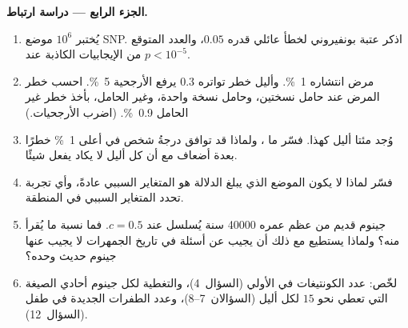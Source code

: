 \begin{problem}
\medskip
\noindent\textbf{الجزء الرابع --- دراسة ارتباط.}
\begin{enumerate}[resume]
  \item يُختبر $10^{6}$ موضع SNP. اذكر عتبة بونفيروني لخطأ
        عائلي قدره $0.05$، والعدد المتوقع من الإيجابيات
        الكاذبة عند $p < 10^{-5}$.
  \item مرض انتشاره \qty{1}{\%}. وأليل خطر تواتره
        $0.3$ يرفع الأرجحية \qty{5}{\%}. احسب خطر المرض
        عند حامل نسختين، وحامل نسخة واحدة، وغير الحامل، بأخذ
        خطر غير الحامل \qty{0.9}{\%}. (اضرب الأرجحيات.)
  \item وُجد مئتا أليل كهذا. فسّر ما ،
        ولماذا قد توافق درجةُ شخص في أعلى \qty{1}{\%}
        خطرًا بعدة أضعاف مع أن كل أليل لا يكاد يفعل
        شيئًا.
  \item فسّر لماذا لا يكون الموضع الذي يبلغ الدلالة هو المتغاير
        السببي عادةً، وأي تجربة تحدد المتغاير السببي
        في المنطقة.
  \item جينوم قديم من عظم عمره \num{40000} سنة يُسلسل
        عند $c = 0.5$. فما نسبة ما يُقرأ منه؟ ولماذا يستطيع مع ذلك أن
        يجيب عن أسئلة في تاريخ الجمهرات لا يجيب عنها جينوم
        حديث وحده؟
  \item لخّص: عدد الكونتيغات في  الأولي
        (السؤال~4)، والتغطية لكل جينوم أحادي الصيغة التي تعطي نحو
        $15$  لكل أليل (السؤالان~7--8)، وعدد الطفرات الجديدة
        في طفل (السؤال~12).
\end{enumerate}
\end{problem}
